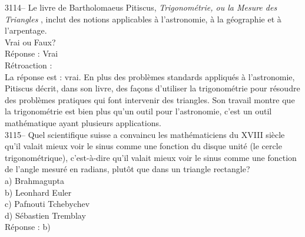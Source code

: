 \documentclass[letterpaper, 12pt]{article}
\begin{document}
3114-- Le livre de Bartholomaeus Pitiscus, \og \emph{Trigonom\'etrie, ou la Mesure des Triangles} \fg, inclut des notions applicables \`a l'astronomie, \`a la g\'eographie et \`a l'arpentage.\\
Vrai ou Faux?\\

R\'eponse : Vrai\\

R\'etroaction :\\
La r\'eponse est : vrai. En plus des probl\`emes standards appliqu\'es \`a l'astronomie, Pitiscus d\'ecrit, dans son livre, des fa\c cons d'utiliser la trigonom\'etrie pour r\'esoudre des probl\`emes pratiques qui font intervenir des triangles. Son travail montre que la trigonom\'etrie est bien plus qu'un outil pour l'astronomie, c'est un outil math\'ematique ayant plusieurs applications.\\



3115-- Quel scientifique suisse a convaincu les math\'ematiciens du {\scriptsize XVIII\ieme{}} si\`ecle qu'il valait mieux voir le sinus comme une fonction du disque unit\'e (le cercle trigonom\'etrique), c'est-\`a-dire qu'il valait mieux voir le sinus comme une fonction de l'angle mesur\'e en radians, plut\^ot que dans un triangle rectangle?\\

a) Brahmagupta\\
b) Leonhard Euler\\
c) Pafnouti Tchebychev\\
d) S\'ebastien Tremblay\\

R\'eponse : b)\\
\end{document}
